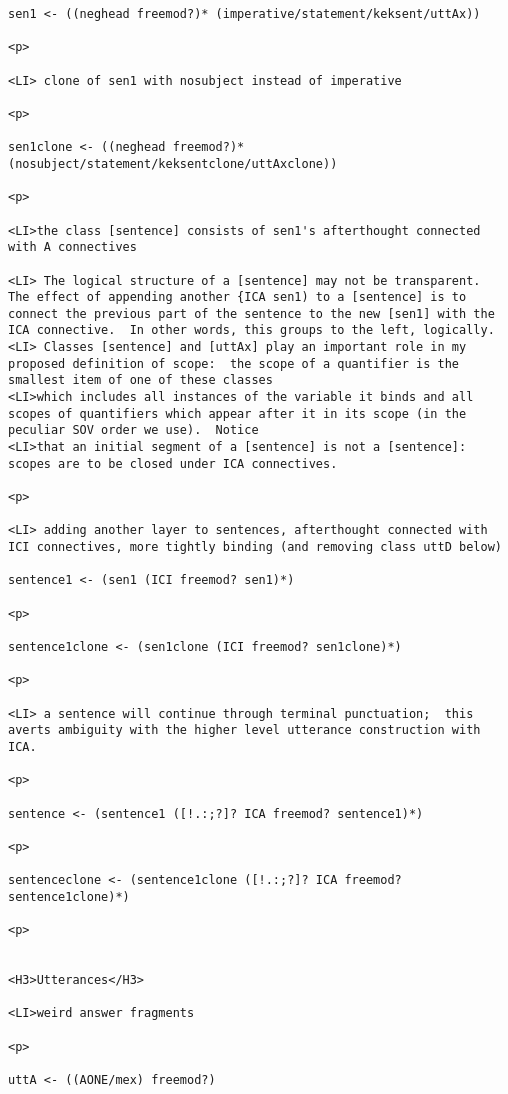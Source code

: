 \documentclass[12pt]{article}
\begin{document}
\begin{lstlisting}
sen1 <- ((neghead freemod?)* (imperative/statement/keksent/uttAx))

<p>

<LI> clone of sen1 with nosubject instead of imperative

<p>

sen1clone <- ((neghead freemod?)* (nosubject/statement/keksentclone/uttAxclone))

<p>

<LI>the class [sentence] consists of sen1's afterthought connected with A connectives

<LI> The logical structure of a [sentence] may not be transparent.  The effect of appending another {ICA sen1) to a [sentence] is to connect the previous part of the sentence to the new [sen1] with the ICA connective.  In other words, this groups to the left, logically.
<LI> Classes [sentence] and [uttAx] play an important role in my proposed definition of scope:  the scope of a quantifier is the smallest item of one of these classes
<LI>which includes all instances of the variable it binds and all scopes of quantifiers which appear after it in its scope (in the peculiar SOV order we use).  Notice
<LI>that an initial segment of a [sentence] is not a [sentence]:  scopes are to be closed under ICA connectives.

<p>

<LI> adding another layer to sentences, afterthought connected with ICI connectives, more tightly binding (and removing class uttD below)

sentence1 <- (sen1 (ICI freemod? sen1)*)

<p>

sentence1clone <- (sen1clone (ICI freemod? sen1clone)*)

<p>

<LI> a sentence will continue through terminal punctuation;  this averts ambiguity with the higher level utterance construction with ICA.

<p>

sentence <- (sentence1 ([!.:;?]? ICA freemod? sentence1)*)

<p>

sentenceclone <- (sentence1clone ([!.:;?]? ICA freemod? sentence1clone)*)

<p>


<H3>Utterances</H3>

<LI>weird answer fragments

<p>

uttA <- ((AONE/mex) freemod?)


\end{lstlisting}
\end{document}
